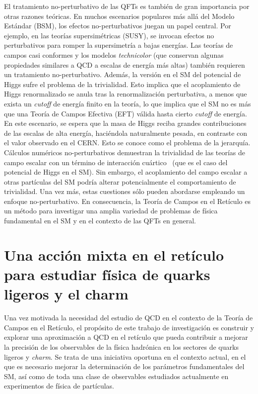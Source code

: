 El tratamiento no-perturbativo de las QFTs es también de gran importancia por otras razones teóricas. En muchos escenarios populares más allá del Modelo Estándar (BSM), los efectos no-perturbativos juegan un papel central. Por ejemplo, en las teorías supersimétricas (SUSY), se invocan efectos no perturbativos para romper la supersimetría a bajas energías. Las teorías de campos casi conformes y los modelos \textit{technicolor} (que conservan algunas propiedades similares a QCD a escalas de energía más altas) también requieren un tratamiento no-perturbativo.  Además, la versión en el SM del potencial de Higgs sufre el problema de la trivialidad. Esto implica que el acoplamiento de Higgs renormalizado se anula tras la renormalización perturbativa, a menos que exista un \textit{cutoff} de energía finito en la teoría, lo que implica que el SM no es más que una Teoría de Campos Efectiva (EFT) válida hasta cierto \textit{cutoff} de energía. En este escenario, se espera que la masa de Higgs reciba grandes contribuciones de las escalas de alta energía, haciéndola naturalmente pesada, en contraste con el valor observado en el CERN. Esto se conoce como el problema de la jerarquía. Cálculos numéricos no-perturbativos demuestran la trivialidad de las teorías de campo escalar con un término de interacción cuártico~\citep{Luscher:1987ek} (que es el caso del potencial de Higgs en el SM). Sin embargo, el acoplamiento del campo escalar a otras partículas del SM podría alterar potencialmente el comportamiento de trivialidad. Una vez más, estas cuestiones sólo pueden abordarse empleando un enfoque no-perturbativo. En consecuencia, la Teoría de Campos en el Retículo es un método para investigar una amplia variedad de problemas de física fundamental en el SM y en el contexto de las QFTs en general.

\section*{Una acción mixta en el retículo para estudiar física de quarks ligeros y el charm} 

Una vez motivada la necesidad del estudio de QCD en el contexto de la Teoría de Campos en el Retículo, el propósito de este trabajo de investigación es construir y explorar una aproximación a QCD en el retículo que pueda contribuir a mejorar la precisión de los observables de la física hadrónica en los sectores de quarks ligeros y \textit{charm}. Se trata de una iniciativa oportuna en el contexto actual, en el que es necesario mejorar la determinación de los parámetros fundamentales del SM, así como de toda una clase de observables estudiados actualmente en experimentos de física de partículas. 

